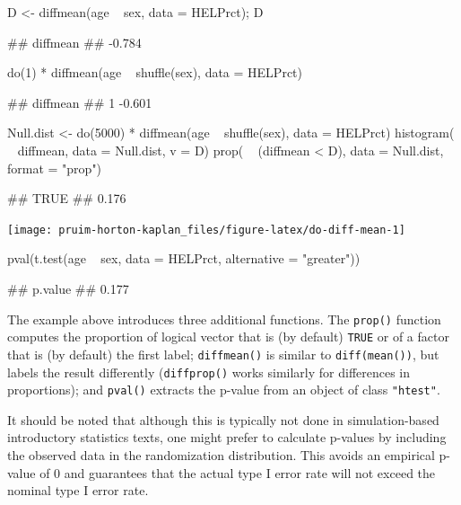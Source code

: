 \begin{Schunk}
\begin{Sinput}
D <- diffmean(age ~ sex, data = HELPrct); D 
\end{Sinput}
\begin{Soutput}
## diffmean 
##   -0.784
\end{Soutput}
\begin{Sinput}
do(1) * diffmean(age ~ shuffle(sex), data = HELPrct)
\end{Sinput}
\begin{Soutput}
##   diffmean
## 1   -0.601
\end{Soutput}
\begin{Sinput}
Null.dist <- do(5000) * diffmean(age ~ shuffle(sex), data = HELPrct)
histogram( ~ diffmean, data = Null.dist, v = D)
prop( ~ (diffmean < D), data = Null.dist, format = "prop")
\end{Sinput}
\begin{Soutput}
##  TRUE 
## 0.176
\end{Soutput}


\begin{center}\texttt{[image: pruim-horton-kaplan\_files/figure-latex/do-diff-mean-1]} \end{center}

\end{Schunk}

\begin{Schunk}
\begin{Sinput}
pval(t.test(age ~ sex, data = HELPrct, alternative = "greater"))
\end{Sinput}
\begin{Soutput}
## p.value 
##   0.177
\end{Soutput}
\end{Schunk}

The example above introduces three additional  functions.
The \texttt{prop()} function computes the proportion of logical vector
that is (by default) \texttt{TRUE} or of a factor that is (by default)
the first label; \texttt{diffmean()} is similar to
\texttt{diff(mean())}, but labels the result differently
(\texttt{diffprop()} works similarly for differences in proportions);
and \texttt{pval()} extracts the p-value from an object of class
\texttt{"htest"}.

It should be noted that although this is typically not done in
simulation-based introductory statistics texts, one might prefer to
calculate p-values by including the observed data in the randomization
distribution. This avoids an empirical p-value of 0 and guarantees that
the actual type I error rate will not exceed the nominal type I error
rate.


